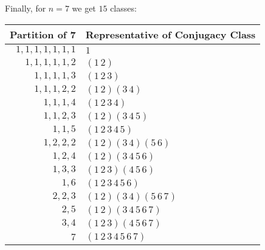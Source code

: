 \begin{solution}
  Finally, for $n = 7$ we get $15$ classes:
  \begin{center}
    \begin{tabular}{r|l}
      \bf Partition of 7 & \bf Representative of Conjugacy Class \\
      \hline
      $1, 1, 1, 1, 1, 1, 1$ & $1$ \\
      $1, 1, 1, 1, 1, 2$ & $(1\,2)$ \\
      $1, 1, 1, 1, 3$ & $(1\,2\,3)$ \\
      $1, 1, 1, 2, 2$ & $(1\,2)(3\,4)$ \\
      $1, 1, 1, 4$ & $(1\,2\,3\,4)$ \\
      $1, 1, 2, 3$ & $(1\,2)(3\,4\,5)$ \\
      $1, 1, 5$ & $(1\,2\,3\,4\,5)$ \\
      $1, 2, 2, 2$ & $(1\,2)(3\,4)(5\,6)$ \\
      $1, 2, 4$ & $(1\,2)(3\,4\,5\,6)$ \\
      $1, 3, 3$ & $(1\,2\,3)(4\,5\,6)$ \\
      $1, 6$ & $(1\,2\,3\,4\,5\,6)$ \\
      $2, 2, 3$ & $(1\,2)(3\,4)(5\,6\,7)$ \\
      $2, 5$ & $(1\,2)(3\,4\,5\,6\,7)$ \\
      $3, 4$ & $(1\,2\,3)(4\,5\,6\,7)$ \\
      $7$ & $(1\,2\,3\,4\,5\,6\,7)$
    \end{tabular}
  \end{center}
\end{solution}
